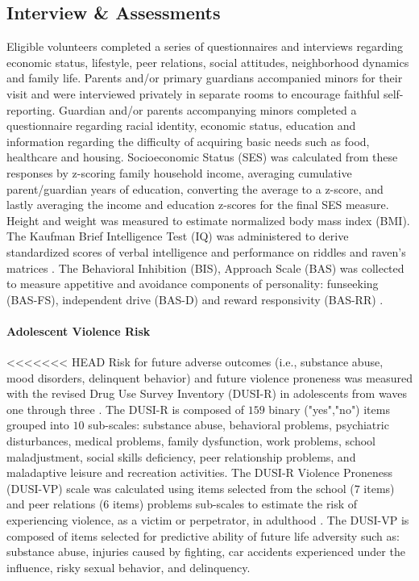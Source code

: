 \documentclass[utf8]{article}
\begin{document}
\subsection*{Interview \& Assessments}
Eligible volunteers completed a series of questionnaires and interviews regarding economic status, lifestyle, peer relations, social attitudes, neighborhood dynamics and family life. Parents and/or primary guardians accompanied minors for their visit and were interviewed privately in separate rooms to encourage faithful self-reporting. Guardian and/or parents accompanying minors completed a questionnaire regarding racial identity, economic status, education and information regarding the difficulty of acquiring basic needs such as food, healthcare and housing. Socioeconomic Status (SES) was calculated from these responses by z-scoring family household income, averaging cumulative parent/guardian years of education, converting the average to a z-score, and lastly averaging the income and education z-scores for the final SES measure. Height and weight was measured to estimate normalized body mass index (BMI). The Kaufman Brief Intelligence Test (IQ) was administered to derive standardized scores of verbal intelligence and performance on riddles and raven’s matrices \citep{kaufman2004kaufman}. The Behavioral Inhibition (BIS), Approach Scale (BAS) was collected to measure appetitive and avoidance components of personality:  funseeking (BAS-FS), independent drive (BAS-D) and reward responsivity (BAS-RR) \citep{carver1994behavioral}.
\paragraph{Adolescent Violence Risk} 
<<<<<<< HEAD
Risk for future adverse outcomes (i.e., substance abuse, mood disorders, delinquent behavior) and future violence proneness was measured with the revised Drug Use Survey Inventory (DUSI-R) in adolescents from waves one through three  \citep*{tarter1994reliability}. The DUSI-R is composed of $159$ binary ("yes","no") items grouped into $10$ sub-scales: substance abuse, behavioral problems, psychiatric disturbances, medical problems, family dysfunction, work problems, school maladjustment, social skills deficiency, peer relationship problems, and maladaptive leisure and recreation activities. The DUSI-R Violence Proneness (DUSI-VP) scale was calculated using items selected from the school ($7$ items) and peer relations ($6$ items) problems sub-scales to estimate the risk of experiencing violence, as a victim or perpetrator, in adulthood \citep*{kirisci2009violence}. The DUSI-VP is composed of items selected for predictive ability of future life adversity such as: substance abuse, injuries caused by fighting, car accidents experienced under the influence, risky sexual behavior, and delinquency.
\end{document}
